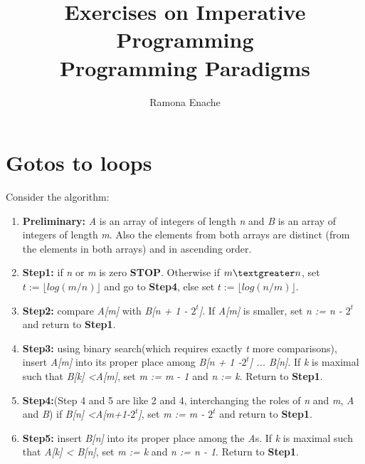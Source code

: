 \documentclass{article}
\begin{document}

\title{Exercises on Imperative Programming\\
  \large Programming Paradigms}
\author{Ramona Enache}
\maketitle

\newcommand{\percent}[1]{} %
\section{Gotos to loops}

Consider the algorithm:

\begin{enumerate}
\item \textbf {Preliminary:} {\it A} is an array of integers of length
  {\it n} and {\it B} is an array of integers of length {\it m}. Also
  the elements from both arrays are distinct (from the elements in
  both arrays) and in ascending order. 

\item \textbf{Step1:} if {\it n} or {\it m} is zero
  \textbf{STOP}. Otherwise if  $m\textgreater n$, set $t := \lfloor log
    \left ( m \slash n \right ) \rfloor $  and go to \textbf{Step4},
    else set $t := \lfloor log
    \left ( n \slash m \right ) \rfloor $.

\item \textbf{Step2:} compare {\it A[m]} with {\it B[n + 1 -
    $2^t$]}. If {\it A[m]} is smaller, set {\it n := n - $2^t$} and
  return to \textbf{Step1}.

\item \textbf{Step3:} using binary search(which requires exactly {\it
    t} more comparisons), insert {\it A[m]} into its proper place
  among {\it B[n + 1 -$2^t$] ... B[n]}. If {\it k} is maximal such
  that {\it B[k] \textless A[m]}, set {\it m := m - 1} and {\it n :=
    k}. Return to \textbf{Step1}.

\item \textbf{Step4:}(Step 4 and 5 are like 2 and 4, interchanging the
  roles of {\it n} and {\it m}, {\it A} and {\it B}) if {\it B[n]
    \textless A[m+1-$2^t$]}, set {\it m := m - $2^t$} and return to
  \textbf{Step1}.

\item \textbf{Step5:} insert {\it B[n]} into its proper place among
  the {\it A}s. If {\it k} is maximal such that {\it A[k] \textless
    B[n]}, set {\it m := k} and {\it n := n - 1}. Return to \textbf{Step1}.


\end{enumerate}
\end{document}
